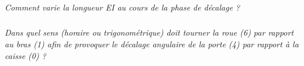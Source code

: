 \documentclass[10pt]{article}
\begin{document}
\subparagraph{}
\textit{Comment varie la longueur EI au cours de la phase de décalage ?}



\subparagraph{}
\textit{Dans quel sens (horaire ou trigonométrique) doit tourner la roue (6) par rapport au bras (1) afin de provoquer le décalage angulaire de la porte (4) par rapport à la caisse (0) ?}
\end{document}
